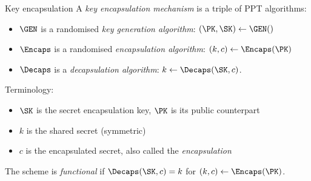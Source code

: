 \begin{frame}{Key encapsulation}
  A \emph{key encapsulation mechanism} is a triple of PPT algorithms:
  \begin{itemize}[<+(1)->]
    \item $\GEN$ is a randomised \emph{key generation algorithm}: $(\PK,\SK)\gets\GEN()$
    \item $\Encaps$ is a randomised \emph{encapsulation algorithm}: $(k, c)\gets\Encaps(\PK)$
    \item $\Decaps$ is a \emph{decapsulation algorithm}: $k\gets\Decaps(\SK, c)$.
  \end{itemize}

  \pause
  Terminology:
  \begin{itemize}[<+(1)->]
    \item $\SK$ is the secret encapsulation key, $\PK$ is its public counterpart
    \item $k$ is the shared secret (symmetric)
    \item $c$ is the encapsulated secret, also called the \emph{encapsulation}
  \end{itemize}

  \pause
  The scheme is \emph{functional} if $\Decaps(\SK, c) = k$ for $(k,c) \gets \Encaps(\PK)$.
\end{frame}

